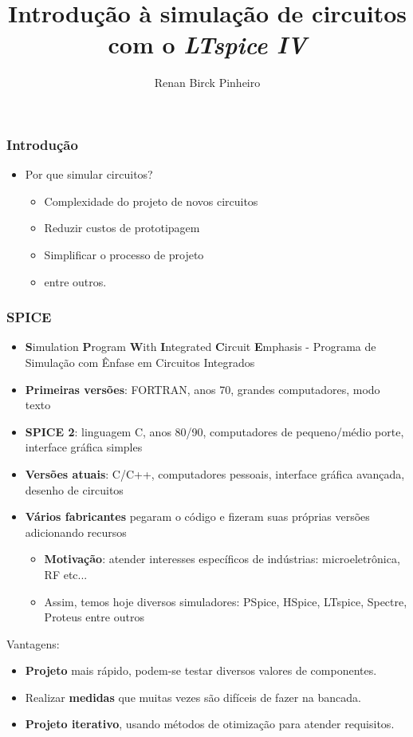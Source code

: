 \documentclass{beamer}
\title{Introdução à simulação de circuitos com o \textit{LTspice IV}}
\author{Renan Birck Pinheiro}
\institute{Universidade Federal de Santa Maria}
\begin{document}
\begin{frame}
\titlepage
\end{frame}

\begin{frame} %
\frametitle{Introdução}
\begin{itemize}
\item{Por que simular circuitos?}
\begin{itemize}
\pause
\item{Complexidade do projeto de novos circuitos}
\pause
\item{Reduzir custos de prototipagem}
\pause
\item{Simplificar o processo de projeto}
\pause
\item{entre outros.}
\end{itemize}
\end{itemize}
\end{frame} %

\begin{frame} %
\frametitle{SPICE}
\begin{itemize}
\item{\textbf{S}imulation \textbf{P}rogram \textbf{W}ith \textbf{I}ntegrated \textbf{C}ircuit \textbf{E}mphasis - Programa de Simulação com Ênfase em Circuitos Integrados}
\item{\textbf{Primeiras versões}: FORTRAN, anos 70, grandes computadores, modo texto}
\item{\textbf{SPICE 2}: linguagem C, anos 80/90, computadores de pequeno/médio porte, interface gráfica simples}
\item{\textbf{Versões atuais}: C/C++, computadores pessoais, interface gráfica avançada, desenho de circuitos}
\pause
\item{\textbf{Vários fabricantes} pegaram o código e fizeram suas próprias versões adicionando recursos}
\begin{itemize}
\item{\textbf{Motivação}: atender interesses específicos de indústrias: microeletrônica, RF etc...}
\item{Assim, temos hoje diversos simuladores: PSpice, HSpice, LTspice, Spectre, Proteus entre outros}
\end{itemize}
\end{itemize}
\end{frame} %

\begin{frame}
Vantagens:
\begin{itemize}
\item{\textbf{Projeto}} mais rápido, podem-se testar diversos valores de componentes.
\item{Realizar \textbf{medidas}} que muitas vezes são difíceis de fazer na bancada.
\item{\textbf{Projeto iterativo}}, usando métodos de otimização para atender requisitos.
\end{itemize}

\end{frame}
\end{document}
